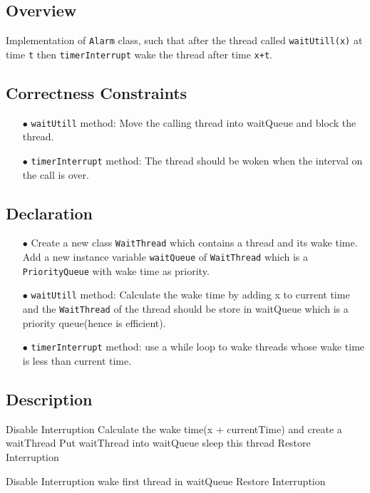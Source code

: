 \documentclass{article}
\begin{document}
\subsection{Overview}
Implementation of \texttt{Alarm} class, such that after the thread called \texttt{waitUtill(x)} at time \texttt{t} then \texttt{timerInterrupt} 
wake the thread after time \texttt{x+t}.
\subsection{Correctness Constraints}
\begin{enumerate}
	\item[$\bullet$] \texttt{waitUtill} method: Move the calling thread into waitQueue and block the thread. 
	\item[$\bullet$] \texttt{timerInterrupt} method: The thread should be woken when the interval on the call is over.
\end{enumerate}
\subsection{Declaration}
\begin{enumerate}
	\item[$\bullet$] Create a new class \texttt{WaitThread} which contains a thread and its wake time. 
Add a new instance variable \texttt{waitQueue} of \texttt{WaitThread} which is a \texttt{PriorityQueue} with wake time as priority. 
	\item[$\bullet$] \texttt{waitUtill} method: Calculate the wake time by adding x to current time and the \texttt{WaitThread} of the thread
		should be store in waitQueue which is a priority queue(hence is efficient).
	\item[$\bullet$] \texttt{timerInterrupt} method: use a while loop to wake threads whose wake time is less than current time.
\end{enumerate}
\subsection{Description}
\begin{algorithm}
  \begin{algorithmic}
			\State Disable Interruption
			\State Calculate the wake time(x + currentTime) and create a waitThread
			\State Put waitThread into waitQueue
			\State sleep this thread
			\State Restore Interruption
		\EndProcedure
  \end{algorithmic}
	\begin{algorithmic}
			\State Disable Interruption
					\State wake first thread in waitQueue
			\EndWhile
			\State Restore Interruption
		\EndProcedure
  \end{algorithmic}
\end{algorithm}
\end{document}

